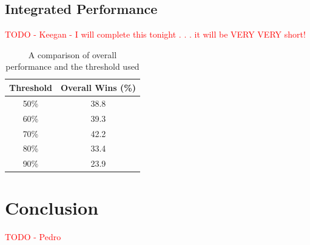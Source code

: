 \documentclass{article}
\newcommand{\xxx}[1]{\textcolor{red}{#1}}
\theoremstyle{plain}
\theoremstyle{definition}
\theoremstyle{remark}
\begin{document}
\subsection*{Integrated Performance}
\xxx{TODO - Keegan - I will complete this tonight . . . it will be VERY VERY short!}

\begin{table}[h]
\centering
    \begin{tabular}{|c|c|}
        \hline
        \bf{Threshold} & \bf{Overall Wins (\%) }\\ \hline
        50\%      & 38.8   \\ \hline
        60\%      & 39.3   \\ \hline
        70\%      & 42.2   \\ \hline
        80\%      & 33.4   \\ \hline
        90\%      & 23.9   \\
        \hline
    \end{tabular}
\label{svm_thresh}
\caption{A comparison of overall performance and the threshold used}
\end{table}

\section{Conclusion}
\xxx{TODO - Pedro}




\end{document}
